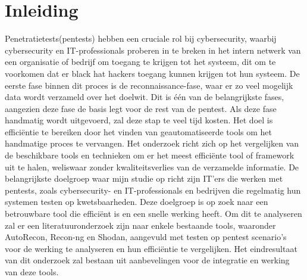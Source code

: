 


% 




\section{Inleiding}%
\label{sec:inleiding}

Penetratietests(pentests) hebben een cruciale rol bij cybersecurity, waarbij cybersecurity en IT-professionals proberen in te breken in het intern netwerk 
van een organisatie of bedrijf om toegang te krijgen tot het systeem, dit om te voorkomen dat er black hat hackers toegang kunnen krijgen tot hun systeem. 
De eerste fase binnen dit proces is de reconnaissance-fase, waar er zo veel mogelijk data wordt verzameld over het doelwit. Dit is één van de belangrijkste fases, 
aangezien deze fase de basis legt voor de rest van de pentest. Als deze fase handmatig wordt uitgevoerd, zal deze stap te veel tijd kosten. 
Het doel is efficiëntie te bereiken door het vinden van geautomatiseerde tools om het handmatige proces te vervangen.
Het onderzoek richt zich op het vergelijken van de beschikbare tools en technieken om er het meest efficiënte tool of framework uit te halen, weliswaar zonder kwaliteitsverlies van de verzamelde informatie.
De belangrijkste doelgroep waar mijn studie op richt zijn IT’ers die werken met pentests, zoals cybersecurity- en IT-professionals en bedrijven die regelmatig hun systemen testen op kwetsbaarheden. 
Deze doelgroep is op zoek naar een betrouwbare tool die efficiënt is en een snelle werking heeft. 
Om dit te analyseren zal er een literatuuronderzoek zijn naar enkele bestaande tools, waaronder 
AutoRecon, Recon-ng en Shodan, aangevuld met testen op pentest scenario’s voor de werking te analyseren en hun efficiëntie te vergelijken. 
Het eindresultaat van dit onderzoek zal bestaan uit aanbevelingen voor de integratie en werking van deze tools.



